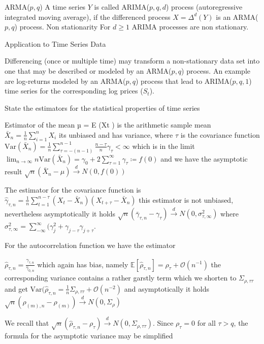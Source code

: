ARMA(\(p, q\))
A time series \(Y\) is called ARIMA(\(p, q, d\)) process (autoregressive integrated moving average), if the differenced process \(X = \Delta^d (Y)\) is an ARMA(\(p, q\)) process.
Non stationarity
For \(d \ge 1\) ARIMA processes are non stationary.

Application to Time Series Data

Differencing (once or multiple time) may transform a non-stationary data set into one that may be described or modeled by an ARMA(\(p, q\)) process.
An example are log-returns modeled by an ARMA(\(p, q\)) process that lead to ARIMA(\(p, q, 1\)) time series for the corresponding log prices (\(S_t\)).



State the estimators for the statistical properties of time series

Estimator of the mean µ = E (Xt ) is the arithmetic sample mean
\( \bar{X}_n = \frac{1}{n}\sum_{i=1}^n X_i \)
its unbiased and has variance, where \( \tau \) is the covariance function
\( \text{Var}(\bar{X}_n) = \frac{1}{n}\sum_{\tau=-(n-1)}^{n-1} \frac{n - \tau}{n}\gamma_\tau < \infty \)
which is in the limit
\( \lim_{n \to \infty} n \text{Var}(\bar{X}_n) = \gamma_0 + 2\sum_{\tau = 1}^\infty \gamma_\tau \coloneqq f(0) \)
and we have the asymptotic result
\( \sqrt{n}(\bar{X}_n - \mu) \xrightarrow{d} N(0, f(0)) \)

The estimator for the covariance function is
\( \hat{\gamma}_{\tau,n} = \frac{1}{n}\sum_{t=1}^{n-\tau} (X_t - \bar{X}_n)(X_{t + \tau} - \bar{X}_n)\)
this estimator is not unbiased, nevertheless asymptotically it holds 
\( \sqrt{n}(\bar{\gamma}_{\tau,n} - \gamma_\tau) \xrightarrow{d} N(0, \sigma^2_{\tau, \infty}) \)
where \( \sigma^2_{\tau, \infty} = \sum^{\infty}_{-\infty} (\gamma^2_j + \gamma_{j - \tau}\gamma_{j + \tau}\).

For the autocorrelation function we have the estimator

\( \hat{\rho}_{\tau,n} = \frac{\hat{\gamma}_{\tau,n}}{\hat{\gamma}_{0,n}} \)
which again has bias, namely \( \mathbb{E}[\hat{\rho}_{\tau,n}] = \rho_\tau + \mathcal{O}(n^{-1}) \)
the corresponding variance contains a rather garstly term which we shorten to \( \Sigma_{\rho,\tau \tau} \) 
and get \( \text{Var}(\hat{\rho}_{\tau, n} = \frac{1}{n} \Sigma_{\rho,\tau \tau} + \mathcal{O}(n^{-2})\)
and asymptotically it holds 
\( \sqrt{n}(\rho_{(m),n} - \rho_{(m)}) \xrightarrow{d} N(0, \Sigma_\rho) \)


We recall that \(\sqrt{n} (\hat{\rho}_{\tau, n} - \rho_\tau) \stackrel{d}{\longrightarrow} N(0, \Sigma_{\rho, \tau \tau})\).
Since \(\rho_\tau = 0\) for all \(\tau > q\), the formula for the asymptotic variance may be simplified

